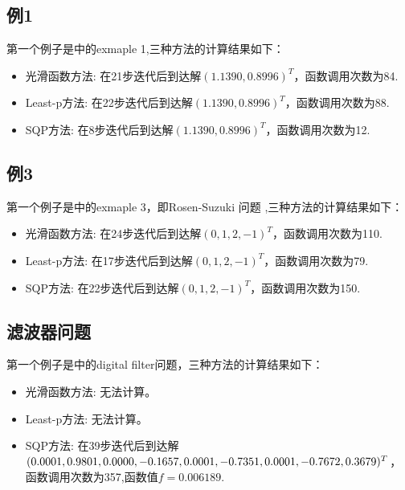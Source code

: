 \documentclass[a4paper,  11pt]{ctexart}
\begin{document}
\subsection{例1}
第一个例子是\cite{smooth}中的exmaple 1,三种方法的计算结果如下：
\begin{itemize}
  \item 光滑函数方法: 
    在21步迭代后到达解$(1.1390,0.8996)^T$，函数调用次数为84.
  \item Least-p方法:
    在22步迭代后到达解$(1.1390,0.8996)^T$，函数调用次数为88.
  \item SQP方法:
    在8步迭代后到达解$(1.1390,0.8996)^T$，函数调用次数为12.
\end{itemize}
\subsection{例3}
第一个例子是\cite{smooth}中的exmaple 3，即Rosen-Suzuki 问题
,三种方法的计算结果如下：
\begin{itemize}
  \item 光滑函数方法: 
    在24步迭代后到达解$(0,1,2,-1)^T$，函数调用次数为110.
  \item Least-p方法:
    在17步迭代后到达解$(0,1,2,-1)^T$，函数调用次数为79.
  \item SQP方法:
    在22步迭代后到达解$(0,1,2,-1)^T$，函数调用次数为150.
\end{itemize}
\subsection{滤波器问题}
第一个例子是\cite{leastp}中的digital filter问题，三种方法的计算结果如下：
\begin{itemize}
  \item 光滑函数方法: 
  无法计算。
  \item Least-p方法:
  无法计算。
  \item SQP方法:
    在39步迭代后到达解
    $(0.0001,0.9801,0.0000,-0.1657,0.0001,-0.7351,\\
    0.0001,-0.7672,0.3679)^T$，
    函数调用次数为357,函数值$f=0.006189$.
\end{itemize}
\end{document}
